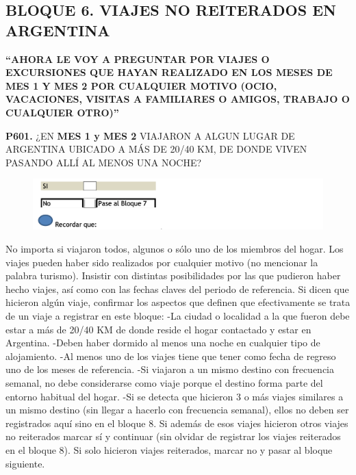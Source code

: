 \documentclass[
  openany]{book}
\begin{document}
\hypertarget{bloque-6.-viajes-no-reiterados-en-argentina}{%
\subsection{\texorpdfstring{\textbf{BLOQUE 6. VIAJES NO REITERADOS EN ARGENTINA}}{BLOQUE 6. VIAJES NO REITERADOS EN ARGENTINA}}\label{bloque-6.-viajes-no-reiterados-en-argentina}}

\textbf{``AHORA LE VOY A PREGUNTAR POR VIAJES O EXCURSIONES QUE HAYAN REALIZADO EN LOS MESES DE MES 1 Y MES 2 POR CUALQUIER MOTIVO (OCIO, VACACIONES, VISITAS A FAMILIARES O AMIGOS, TRABAJO O CUALQUIER OTRO)''}

\textbf{P601.} ¿EN \textbf{MES 1 y MES 2} VIAJARON A ALGUN LUGAR DE ARGENTINA UBICADO A MÁS DE 20/40 KM, DE DONDE VIVEN PASANDO ALLÍ AL MENOS UNA NOCHE?

\begin{figure}

{\centering \includegraphics[width=1\linewidth]{imagenes/figura6-206} 

}

\end{figure}

No importa si viajaron todos, algunos o sólo uno de los miembros del hogar.
Los viajes pueden haber sido realizados por cualquier motivo (no mencionar la palabra turismo). Insistir con distintas posibilidades por las que pudieron haber hecho viajes, así como con las fechas claves del periodo de referencia.
Si dicen que hicieron algún viaje, confirmar los aspectos que definen que efectivamente se trata de un viaje a registrar en este bloque:
-La ciudad o localidad a la que fueron debe estar a más de 20/40 KM de donde reside el hogar contactado y estar en Argentina.
-Deben haber dormido al menos una noche en cualquier tipo de alojamiento.
-Al menos uno de los viajes tiene que tener como fecha de regreso uno de los meses de referencia.
-Si viajaron a un mismo destino con frecuencia semanal, no debe considerarse como viaje porque el destino forma parte del entorno habitual del hogar.
-Si se detecta que hicieron 3 o más viajes similares a un mismo destino (sin llegar a hacerlo con frecuencia semanal), ellos no deben ser registrados aquí sino en el bloque 8. Si además de esos viajes hicieron otros viajes no reiterados marcar sí y continuar (sin olvidar de registrar los viajes reiterados en el bloque 8). Si solo hicieron viajes reiterados, marcar no y pasar al bloque siguiente.
\end{document}
